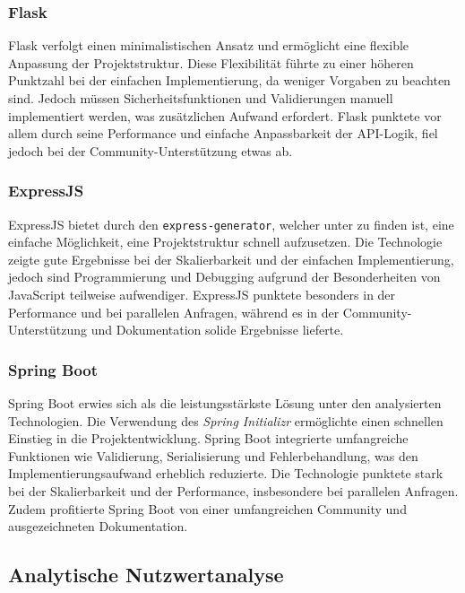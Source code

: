\subsubsection{Flask}

Flask verfolgt einen minimalistischen Ansatz und ermöglicht eine flexible Anpassung der Projektstruktur. Diese Flexibilität führte zu einer höheren Punktzahl bei der einfachen Implementierung, da weniger Vorgaben zu beachten sind. Jedoch müssen Sicherheitsfunktionen und Validierungen manuell implementiert werden, was zusätzlichen Aufwand erfordert. Flask punktete vor allem durch seine Performance und einfache Anpassbarkeit der API-Logik, fiel jedoch bei der Community-Unterstützung etwas ab.

\subsubsection{ExpressJS}

ExpressJS bietet durch den \texttt{express-generator}, welcher unter \cite{website-expressjs-generator} zu finden ist, eine einfache Möglichkeit, eine Projektstruktur schnell aufzusetzen. Die Technologie zeigte gute Ergebnisse bei der Skalierbarkeit und der einfachen Implementierung, jedoch sind Programmierung und Debugging aufgrund der Besonderheiten von JavaScript teilweise aufwendiger. ExpressJS punktete besonders in der Performance und bei parallelen Anfragen, während es in der Community-Unterstützung und Dokumentation solide Ergebnisse lieferte.

\subsubsection{Spring Boot}

Spring Boot erwies sich als die leistungsstärkste Lösung unter den analysierten Technologien. Die Verwendung des \textit{Spring Initializr} ermöglichte einen schnellen Einstieg in die Projektentwicklung. Spring Boot integrierte umfangreiche Funktionen wie Validierung, Serialisierung und Fehlerbehandlung, was den Implementierungsaufwand erheblich reduzierte. Die Technologie punktete stark bei der Skalierbarkeit und der Performance, insbesondere bei parallelen Anfragen. Zudem profitierte Spring Boot von einer umfangreichen Community und ausgezeichneten Dokumentation.

\subsection{Analytische Nutzwertanalyse}

